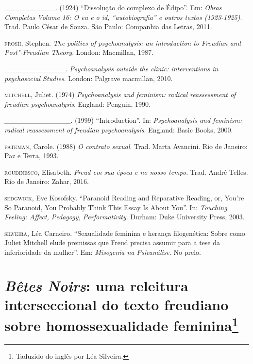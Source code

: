 \begin{Parskip}
\_\_\_\_\_\_\_\_\_\_. (1924) ``Dissolução do complexo de Édipo''. Em: \emph{Obras
Completas Volume 16: O eu e o id, ``autobiografia'' e outros textos
(1923-1925)}. Trad. Paulo César de Souza. São Paulo: Companhia das Letras, 2011.

\textsc{frosh}, Stephen. \emph{The politics of psychoanalysis: an introduction to
Freudian and Post"-Freudian Theory}. London: Macmillan, 1987.

\_\_\_\_\_\_\_\_\_\_\_\_. \emph{Psychoanalysis outside the clinic:
interventions in psychosocial Studies}. London: Palgrave macmillan, 2010.

\textsc{mitchell}, Juliet. (1974) \emph{Psychoanalysis and feminism: radical
reassessment of freudian psychoanalysis}. England: Penguin, 1990.

\_\_\_\_\_\_\_\_\_\_\_\_\_. (1999) ``Introduction''. In: \emph{Psychoanalysis and
feminism: radical reassessment of freudian psychoanalysis}. England: Basic Books, 2000.

\textsc{pateman}, Carole. (1988) \emph{O contrato sexual}. Trad. Marta Avancini. Rio
de Janeiro: Paz e Terra, 1993.

\textsc{roudinesco}, Elisabeth. \emph{Freud em sua época e no nosso tempo}. Trad.
André Telles. Rio de Janeiro: Zahar, 2016.

\textsc{sedgwick}, Eve Kosofsky. ``Paranoid Reading and Reparative Reading, or,
You're So Paranoid, You Probably Think This Essay Is About You''. In:
\emph{Touching Feeling: Affect, Pedagogy, Performativity}. Durham: Duke University Press, 2003.

\textsc{silveira}, Léa Carneiro. ``Sexualidade feminina e herança filogenética:
Sobre como Juliet Mitchell elude premissas que Freud precisa assumir
para a tese da inferioridade da mulher''. Em: \emph{Misogenia na Psicanálise}. No
prelo.
\end{Parskip}

\chapter*{\emph{Bêtes Noirs}: uma releitura interseccional do texto freudiano
sobre homossexualidade feminina\footnote{Taduzido do inglês por Léa
  Silveira.}}


